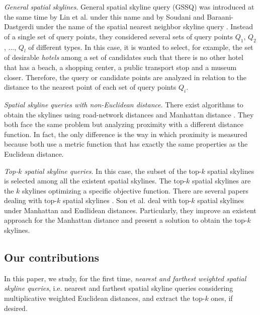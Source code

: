 \documentclass[11pt,onecolumn]{elsart3p}
\begin{document}
\vspace{1em}
{\it General spatial skylines}. General spatial skyline query (GSSQ) was introduced at the same time by Lin et al. under this name \cite{LZZ13} and by Soudani and Baraani-Dastgerdi under the name of the spatial nearest neighbor skyline query \cite{SB13}. Instead of a single set of query points, they considered several sets of query points $Q_1$, $Q_2$, ..., $Q_l$ of different types. In this case, it is wanted to select, for example, the set of desirable {\it hotels} among a set of candidates such that there is no other hotel that has a beach, a shopping center, a public transport stop and a museum closer. Therefore, the query or candidate points are analyzed in relation to the distance to the nearest point of each set of query points $Q_i$.

\vspace{1em}
{\it Spatial skyline queries with non-Euclidean distance}. There exist algorithms to obtain the skylines using road-network distances \cite{SSK09} and Manhattan distance \cite{SHA14}. They both face the same problem but analyzing proximity with a different distance function. In fact, the only difference is the way in which proximity is measured because both use a metric function that has exactly the same properties as the Euclidean distance.

\vspace{1em}
{\it Top-$k$ spatial skyline queries}. In this case, the subset of the top-$k$ spatial skylines is selected among all the existent spatial skylines. The top-$k$ spatial skylines are the $k$ skylines optimizing a specific objective function. There are several papers dealing with top-$k$ spatial skylines \cite{PS14, SSKA17}. Son et al. \cite{SSKA17} deal with top-$k$ spatial skylines under Manhattan and Eudlidean distances. Particularly, they improve an existent approach for the Manhattan distance and present a solution to obtain the top-$k$ skylines.\\

\subsection{Our contributions}

In this paper, we study, for the first time, {\it nearest and farthest weighted spatial skyline queries}, i.e. nearest and farthest spatial skyline queries considering multiplicative weighted Euclidean distances, and extract the top-$k$ ones, if desired.
\end{document}
